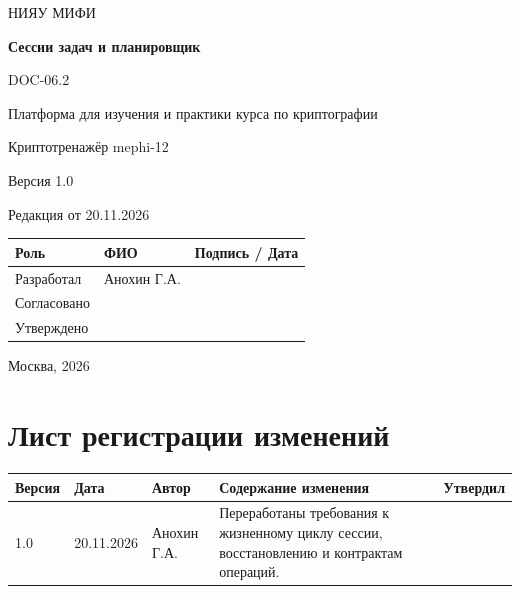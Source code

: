 \documentclass[12pt,a4paper]{article}
\begin{document}
\hypersetup{pageanchor=false}
\begin{titlepage}
  \thispagestyle{empty}
  \centering
  {\large НИЯУ МИФИ\par}
  \vspace*{3.5cm}
  {\LARGE\bfseries Сессии задач и планировщик\par}
  \vspace{0.5cm}
  {\large DOC-06.2\par}
  \vspace{0.6cm}
  {\large Платформа для изучения и практики курса по криптографии\par}
  {\large Криптотренажёр mephi-12\par}
  \vspace{0.7cm}
  {\large Версия 1.0\par}
  {\large Редакция от 20.11.2026\par}
  \vspace{1cm}
  \begin{tabularx}{\textwidth}{@{}p{3.4cm}Xp{4cm}@{}}
    \toprule
    Роль & ФИО & Подпись / Дата \\
    \midrule
    Разработал & Анохин Г.А. & \\
    \addlinespace[6pt]
    Согласовано & & \\
    \addlinespace[6pt]
    Утверждено & & \\
    \bottomrule
  \end{tabularx}
  \vfill
  {\large Москва, 2026\par}
\end{titlepage}
\hypersetup{pageanchor=true}

\section*{Лист регистрации изменений}
\begingroup\small\singlespacing
\noindent
\begin{tabularx}{\textwidth}{@{}p{1.2cm}p{2cm}p{2.5cm}Xp{1.8cm}@{}}
\toprule
Версия & Дата & Автор & Содержание изменения & Утвердил \\
\midrule
1.0 & 20.11.2026 & Анохин Г.А. & Переработаны требования к жизненному циклу сессии, восстановлению и контрактам операций. & \\
\bottomrule
\end{tabularx}
\endgroup
\clearpage
\begingroup\small\singlespacing
\tableofcontents
\endgroup
\clearpage

\hypertarget{doc-062-сессии-задач-и-планировщик}{}
\end{document}
